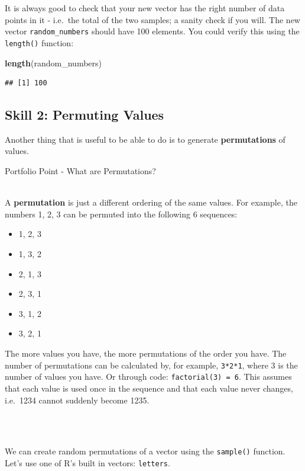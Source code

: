 \documentclass[]{book}
\newenvironment{Shaded}{\begin{snugshade}}{\end{snugshade}}
\newcommand{\KeywordTok}[1]{\textcolor[rgb]{0.13,0.29,0.53}{\textbf{#1}}}
\newcommand{\NormalTok}[1]{#1}
\providecommand{\tightlist}{%
  \setlength{\itemsep}{0pt}\setlength{\parskip}{0pt}}
\newenvironment{info}
    {
    \hline\\
    }
    { 
    \\\\\hline
    }
\begin{document}
It is always good to check that your new vector has the right number of data points in it - i.e.~the total of the two samples; a sanity check if you will. The new vector \texttt{random\_numbers} should have 100 elements. You could verify this using the \texttt{length()} function:

\begin{Shaded}
\begin{Highlighting}[]
\KeywordTok{length}\NormalTok{(random_numbers)}
\end{Highlighting}
\end{Shaded}

\begin{verbatim}
## [1] 100
\end{verbatim}

\hypertarget{skill-2-permuting-values}{%
\subsection{Skill 2: Permuting Values}\label{skill-2-permuting-values}}

Another thing that is useful to be able to do is to generate \textbf{permutations} of values.

Portfolio Point - What are Permutations?

\begin{info}
A \textbf{permutation} is just a different ordering of the same values.
For example, the numbers 1, 2, 3 can be permuted into the following 6
sequences:

\begin{itemize}
\tightlist
\item
  1, 2, 3
\item
  1, 3, 2
\item
  2, 1, 3
\item
  2, 3, 1
\item
  3, 1, 2
\item
  3, 2, 1
\end{itemize}

The more values you have, the more permutations of the order you have.
The number of permutations can be calculated by, for example,
\texttt{3*2*1}, where 3 is the number of values you have. Or through
code: \texttt{factorial(3)\ =\ 6}. This assumes that each value is used
once in the sequence and that each value never changes, i.e.~1234 cannot
suddenly become 1235.
\end{info}

We can create random permutations of a vector using the \texttt{sample()} function. Let's use one of R's built in vectors: \texttt{letters}.
\end{document}
